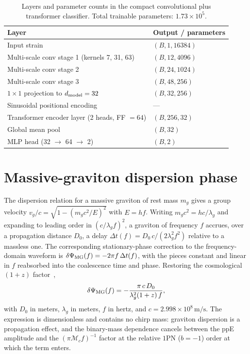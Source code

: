 \documentclass[11pt,a4paper]{article}
\newcommand{\mg}{m_{g}}
\newcommand{\lamg}{\lambda_{g}}
\begin{document}
\begin{table}[h]
  \centering
  \caption{Layers and parameter counts in the compact convolutional plus
    transformer classifier. Total trainable parameters: $1.73\times 10^{5}$.}
  \label{tab:arch}
  \begin{tabular}{ll}
    \hline\hline
    Layer & Output / parameters \\
    \hline
    Input strain                                   & $(B, 1, 16384)$ \\
    Multi-scale conv stage 1 (kernels 7, 31, 63)   & $(B, 12, 4096)$ \\
    Multi-scale conv stage 2                       & $(B, 24, 1024)$ \\
    Multi-scale conv stage 3                       & $(B, 48, 256)$  \\
    $1\!\times\!1$ projection to $d_{\rm model}=32$   & $(B, 32, 256)$ \\
    Sinusoidal positional encoding                 & --- \\
    Transformer encoder layer (2 heads, FF $=64$)  & $(B, 256, 32)$ \\
    Global mean pool                               & $(B, 32)$ \\
    MLP head (32 $\to$ 64 $\to$ 2)                 & $(B, 2)$ \\
    \hline\hline
  \end{tabular}
\end{table}

\section{Massive-graviton dispersion phase}\label{app:phase}

The dispersion relation for a massive graviton of rest mass $\mg$ gives a
group velocity $v_{g}/c = \sqrt{1-(\mg c^{2}/E)^{2}}$ with $E=hf$. Writing
$\mg c^{2}=hc/\lamg$ and expanding to leading order in $(c/\lamg f)^{2}$, a
graviton of frequency $f$ accrues, over a propagation distance $D_{0}$, a
delay $\Delta t(f) = D_{0}\,c/(2\lamg^{2}f^{2})$ relative to a massless one.
The corresponding stationary-phase correction to the frequency-domain
waveform is $\delta\Psi_{\rm MG}(f) = -2\pi f\,\Delta t(f)$, with the pieces
constant and linear in $f$ reabsorbed into the coalescence time and phase.
Restoring the cosmological $(1+z)$ factor~\cite{Will1998,MirshekariYunesWill2012},
\begin{equation}
  \delta\Psi_{\rm MG}(f) = -\frac{\pi\,c\,D_{0}}{\lamg^{2}(1+z)\,f},
\end{equation}
with $D_{0}$ in meters, $\lamg$ in meters, $f$ in hertz, and
$c=2.998\times 10^{8}\,\mathrm{m/s}$. The expression is dimensionless and
contains no chirp mass: graviton dispersion is a propagation effect, and the
binary-mass dependence cancels between the ppE amplitude and the
$(\pi\mathcal{M}_{c}f)^{-1}$ factor at the relative $1$PN ($b=-1$) order at
which the term enters.
\end{document}
